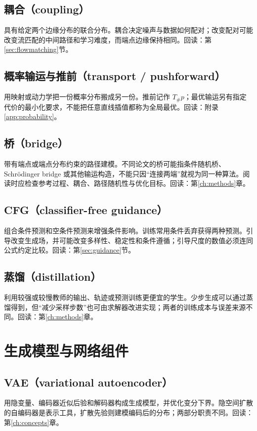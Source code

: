 \subsection*{耦合（coupling）}\label{gl:coupling}
具有给定两个边缘分布的联合分布。耦合决定噪声与数据如何配对；改变配对可能改变流匹配的中间路径和学习难度，而端点边缘保持相同。回读：第\ref{sec:flowmatching}节。

\subsection*{概率输运与推前（transport / pushforward）}\label{gl:transport}
用映射或动力学把一份概率分布搬成另一份。推前记作 $T_\#p$；最优输运另有指定代价的最小化要求，不能把任意直线插值都称为全局最优。回读：附录\ref{app:probability}。

\subsection*{桥（bridge）}\label{gl:bridge}
带有端点或端点分布约束的路径建模。不同论文的桥可能指条件随机桥、Schr\"odinger bridge 或其他输运构造，不能只因“连接两端”就视为同一种算法。阅读时应检查参考过程、耦合、路径随机性与优化目标。回读：第\ref{ch:methods}章。

\subsection*{CFG（classifier-free guidance）}\label{gl:cfg}
组合条件预测和空条件预测来增强条件影响。训练常用条件丢弃获得两种预测。引导改变生成场，并可能改变多样性、稳定性和条件遵循；引导尺度的数值必须连同公式约定比较。回读：第\ref{sec:guidance}节。

\subsection*{蒸馏（distillation）}\label{gl:distillation}
利用较强或较慢教师的输出、轨迹或预测训练更便宜的学生。少步生成可以通过蒸馏得到，但“减少采样步数”也可由求解器改进实现；两者的训练成本与误差来源不同。回读：第\ref{ch:methods}章。

\section{生成模型与网络组件}
\subsection*{VAE（variational autoencoder）}\label{gl:vae}
用隐变量、编码器近似后验和解码器构成生成模型，并优化变分下界。隐空间扩散的自编码器是表示工具，扩散先验则建模编码后的分布；两部分职责不同。回读：第\ref{ch:concepts}章。

